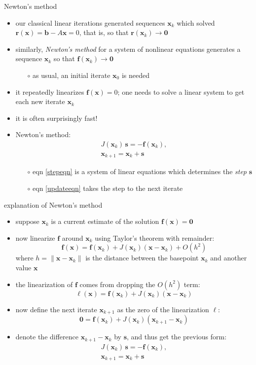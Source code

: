 \documentclass[10pt,hyperref]{beamer}
\newcommand{\bb}{\mathbf{b}}
\newcommand{\bbf}{\mathbf{f}}
\newcommand{\bl}{\bm{\ell}}
\newcommand{\br}{\mathbf{r}}
\newcommand{\bs}{\mathbf{s}}
\newcommand{\bx}{\mathbf{x}}
\newcommand{\bzero}{\bm{0}}
\begin{document}
\begin{frame}{Newton's method}
\begin{itemize}
\item our classical linear iterations generated sequences $\bx_k$ which solved $\br(\bx) = \bb - A \bx = 0$, that is, so that $\br(\bx_k) \to \bzero$
\item similarly, \emph{Newton's method} for a system of nonlinear equations generates a sequence $\bx_k$ so that $\bbf(\bx_k) \to \bzero$

  \begin{itemize}
  \item[$\circ$] as usual, an initial iterate $\bx_0$ is needed
  \end{itemize}
\item it repeatedly linearizes $\bbf(\bx)=0$; one needs to solve a linear system to get each new iterate $\bx_k$
\item it is often surprisingly fast!
\item Newton's method:
\begin{gather}
J(\bx_k)\, \bs = - \bbf(\bx_k), \label{stepeqn} \\
\bx_{k+1} = \bx_k + \bs \label{updateeqn}
\end{gather}

  \begin{itemize}
  \item[$\circ$] eqn \eqref{stepeqn} is a system of linear equations which determines the \emph{step} $\bs$
  \item[$\circ$] eqn \eqref{updateeqn} takes the step to the next iterate
  \end{itemize}
\end{itemize}
\end{frame}


\begin{frame}{explanation of Newton's method}
\begin{itemize}
\item suppose $\bx_k$ is a current estimate of the solution $\bbf(\bx)=\bzero$
\item now linearize $\bbf$ around $\bx_k$ using Taylor's theorem with remainder:
    $$\bbf(\bx) = \bbf(\bx_k) + J(\bx_k) (\bx - \bx_k) + O(h^2)$$
where $h=\|\bx-\bx_k\|$ is the distance between the basepoint $\bx_k$ and another value $\bx$
\item the linearization of $\bbf$ comes from dropping the $O(h^2)$ term:
    $$\bl(\bx) = \bbf(\bx_k) + J(\bx_k) (\bx - \bx_k)$$
\item now define the next iterate $\bx_{k+1}$ as the zero of the linearization $\bl$:
    $$\bzero = \bbf(\bx_k) + J(\bx_k) (\bx_{k+1} - \bx_k)$$
\item denote the difference $\bx_{k+1} - \bx_k$ by $\bs$, and thus get the previous form:
\begin{gather*}
J(\bx_k)\, \bs = - \bbf(\bx_k), \\
\bx_{k+1} = \bx_k + \bs
\end{gather*}
\end{itemize}
\end{frame}
\end{document}

